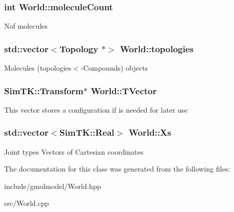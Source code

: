 \subsubsection[{\texorpdfstring{molecule\+Count}{moleculeCount}}]{\setlength{\rightskip}{0pt plus 5cm}int World\+::molecule\+Count}\hypertarget{classWorld_a88ce5b19230917725b4c5656581d04e6}{}\label{classWorld_a88ce5b19230917725b4c5656581d04e6}
Nof molecules 
\subsubsection[{\texorpdfstring{topologies}{topologies}}]{\setlength{\rightskip}{0pt plus 5cm}std\+::vector$<${\bf Topology} $\ast$$>$ World\+::topologies}\hypertarget{classWorld_aa0c16379fe096948946e73bd2a34bbb9}{}\label{classWorld_aa0c16379fe096948946e73bd2a34bbb9}
Molecules (topologies$<$-\/\+Compounds) objects 
\subsubsection[{\texorpdfstring{T\+Vector}{TVector}}]{\setlength{\rightskip}{0pt plus 5cm}Sim\+T\+K\+::\+Transform$\ast$ World\+::\+T\+Vector}\hypertarget{classWorld_a615e5483cdea05073c6a9cde2a945433}{}\label{classWorld_a615e5483cdea05073c6a9cde2a945433}
This vector stores a configuration if is needed for later use 
\subsubsection[{\texorpdfstring{Xs}{Xs}}]{\setlength{\rightskip}{0pt plus 5cm}std\+::vector$<$Sim\+T\+K\+::\+Real$>$ World\+::\+Xs}\hypertarget{classWorld_a0284a9971261c375fb04561a0f4821e6}{}\label{classWorld_a0284a9971261c375fb04561a0f4821e6}
Joint types Vectors of Cartesian coordinates 

The documentation for this class was generated from the following files\+:\begin{DoxyCompactItemize}
\item 
include/gmolmodel/World.\+hpp\item 
src/World.\+cpp\end{DoxyCompactItemize}
